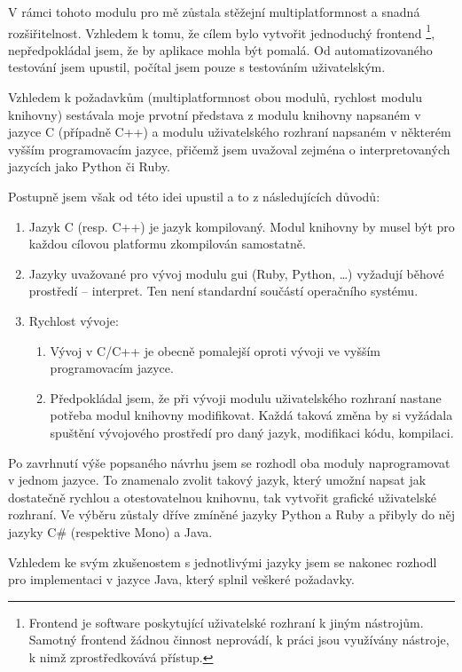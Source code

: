 \documentclass[dp.tex]{subfiles}
\begin{document}
V rámci tohoto modulu pro mě zůstala stěžejní multiplatformnost a snadná rozšiřitelnost. Vzhledem k tomu, že cílem bylo vytvořit jednoduchý frontend \footnote{Frontend je software poskytující uživatelské rozhraní k jiným nástrojům. Samotný frontend žádnou činnost neprovádí, k práci jsou využívány nástroje, k nimž zprostředkovává přístup.}, nepředpokládal jsem, že by aplikace mohla být pomalá. Od automatizovaného testování jsem upustil, počítal jsem pouze s testováním uživatelským.

Vzhledem k požadavkům (multiplatformnost obou modulů, rychlost modulu knihovny) sestávala moje prvotní představa z modulu knihovny napsaném v jazyce C (případně C++) a modulu uživatelského rozhraní napsaném v některém vyšším programovacím jazyce, přičemž jsem uvažoval zejména o interpretovaných jazycích jako Python či Ruby. 

Postupně jsem však od této idei upustil a to z následujících důvodů:
\begin{enumerate}
\item Jazyk C (resp. C++) je jazyk kompilovaný. Modul knihovny by musel být pro každou cílovou platformu zkompilován samostatně.
\item Jazyky uvažované pro vývoj modulu \acrshort{gui} (Ruby, Python, \ldots) vyžadují běhové prostředí -- interpret. Ten není standardní součástí operačního systému.
\item Rychlost vývoje:
	\begin{enumerate}
	\item Vývoj v C/C++ je obecně pomalejší oproti vývoji ve vyšším programovacím jazyce. 
	\item Předpokládal jsem, že při vývoji modulu uživatelského rozhraní nastane potřeba modul knihovny modifikovat. Každá taková změna by si vyžádala spuštění vývojového prostředí pro daný jazyk, modifikaci kódu, kompilaci.
	\end{enumerate}
\end{enumerate}

Po zavrhnutí výše popsaného návrhu jsem se rozhodl oba moduly naprogramovat v jednom jazyce. To znamenalo zvolit takový jazyk, který umožní napsat jak dostatečně rychlou a otestovatelnou knihovnu, tak vytvořit grafické uživatelské rozhraní. Ve výběru zůstaly dříve zmíněné jazyky Python a Ruby a přibyly do něj jazyky C\# (respektive Mono) a Java.

Vzhledem ke svým zkušenostem s jednotlivými jazyky jsem se nakonec rozhodl pro implementaci v jazyce Java, který splnil veškeré požadavky. 
\end{document}
